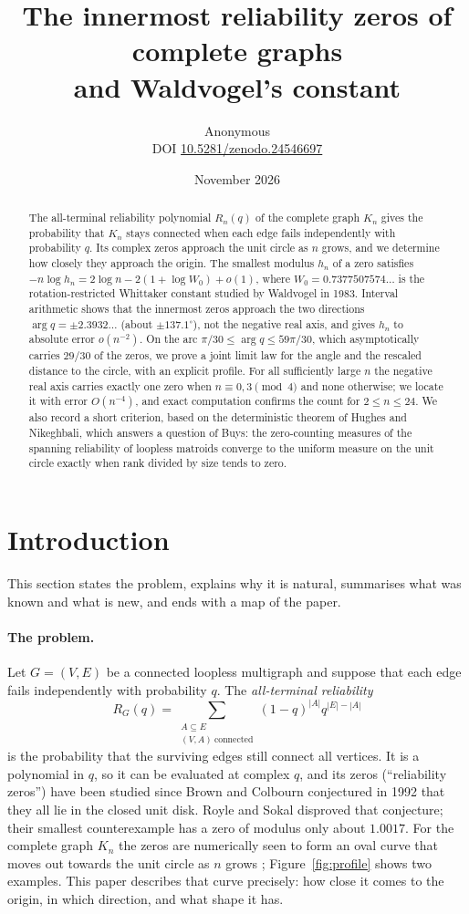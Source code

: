 \documentclass[11pt,a4paper]{article}
\title{\bfseries The innermost reliability zeros of complete graphs\\ and Waldvogel's constant}
\author{Anonymous\\[3pt]{\small DOI \href{https://doi.org/10.5281/zenodo.24546697}{10.5281/zenodo.24546697}}}
\date{November 2026}
\theoremstyle{remark}
\begin{document}
\maketitle

\begin{abstract}
The all-terminal reliability polynomial $R_n(q)$ of the complete graph $K_n$ gives the probability that $K_n$ stays connected when each edge fails independently with probability $q$. Its complex zeros approach the unit circle as $n$ grows, and we determine how closely they approach the origin. The smallest modulus $h_n$ of a zero satisfies $-n\log h_n=2\log n-2(1+\log W_0)+o(1)$, where $W_0=0.7377507574\ldots$ is the rotation-restricted Whittaker constant studied by Waldvogel in 1983. Interval arithmetic shows that the innermost zeros approach the two directions $\arg q=\pm2.3932\ldots$ (about $\pm137.1^\circ$), not the negative real axis, and gives $h_n$ to absolute error $o(n^{-2})$. On the arc $\pi/30\le\arg q\le59\pi/30$, which asymptotically carries $29/30$ of the zeros, we prove a joint limit law for the angle and the rescaled distance to the circle, with an explicit profile. For all sufficiently large $n$ the negative real axis carries exactly one zero when $n\equiv0,3\pmod 4$ and none otherwise; we locate it with error $O(n^{-4})$, and exact computation confirms the count for $2\le n\le24$. We also record a short criterion, based on the deterministic theorem of Hughes and Nikeghbali, which answers a question of Buys: the zero-counting measures of the spanning reliability of loopless matroids converge to the uniform measure on the unit circle exactly when rank divided by size tends to zero.
\end{abstract}

\section{Introduction}\label{sec:intro}
This section states the problem, explains why it is natural, summarises what was known and what is new, and ends with a map of the paper.

\paragraph{The problem.} Let $G=(V,E)$ be a connected loopless multigraph and suppose that each edge fails independently with probability $q$. The \emph{all-terminal reliability}
\[
R_G(q)=\sum_{\substack{A\subseteq E\\ (V,A)\ \text{connected}}}(1-q)^{|A|}q^{|E|-|A|}
\]
is the probability that the surviving edges still connect all vertices. It is a polynomial in $q$, so it can be evaluated at complex $q$, and its zeros (``reliability zeros'') have been studied since Brown and Colbourn conjectured in 1992 that they all lie in the closed unit disk. Royle and Sokal \cite{RS} disproved that conjecture; their smallest counterexample has a zero of modulus only about $1.0017$. For the complete graph $K_n$ the zeros are numerically seen to form an oval curve that moves out towards the unit circle as $n$ grows \cite[\S6]{CS}; Figure~\ref{fig:profile} shows two examples. This paper describes that curve precisely: how close it comes to the origin, in which direction, and what shape it has.
\end{document}
